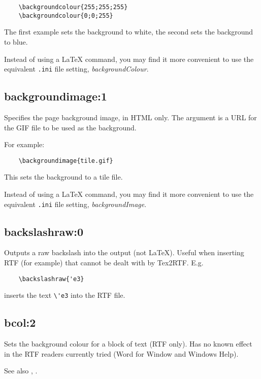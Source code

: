 \begin{verbatim}
    \backgroundcolour{255;255;255}
    \backgroundcolour{0;0;255}
\end{verbatim}

The first example sets the background to white, the second sets the background to blue.

Instead of using a LaTeX command, you may find it more convenient to use the equivalent {\tt .ini} file
setting, {\it backgroundColour}.

\subsection*{backgroundimage:1}\label{backgroundimage}

Specifies the page background image, in HTML only. The argument
is a URL for the GIF file to be used as the background.

For example:

\begin{verbatim}
    \backgroundimage{tile.gif}
\end{verbatim}

This sets the background to a tile file.

Instead of using a LaTeX command, you may find it more convenient to use the equivalent {\tt .ini} file
setting, {\it backgroundImage}.

\subsection*{backslashraw:0}\label{backslashraw}

Outputs a raw backslash into the output (not LaTeX). Useful when
inserting RTF (for example) that cannot be dealt with by Tex2RTF.
E.g.

\begin{verbatim}
    \backslashraw{'e3}
\end{verbatim}

inserts the text \verb$\'e3$ into the RTF file.

\subsection*{bcol:2}\label{bcol}

Sets the background colour for a block of text (RTF only). Has no known effect
in the RTF readers currently tried (Word for Window and Windows Help).

See also , .

